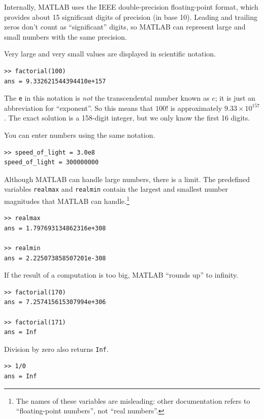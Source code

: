 \documentclass[
]{book}
\begin{document}
Internally, MATLAB uses the IEEE double-precision floating-point
format, which provides about 15 significant digits of precision (in
base 10).  Leading and trailing zeros don't count as ``significant''
digits, so MATLAB can represent large and small numbers
with the same precision.

Very large and very small values are displayed in scientific notation.

\begin{verbatim}
>> factorial(100)
ans = 9.332621544394410e+157
\end{verbatim}

The {\tt e} in this notation is {\em not} the transcendental number
known as $e$; it is just an abbreviation for ``exponent''.  So
this means that $100!$ is approximately $9.33 \times 10^{157}$.  The
exact solution is a 158-digit integer, but we only know the first 16
digits.

You can enter numbers using the same notation.

\begin{verbatim}
>> speed_of_light = 3.0e8
speed_of_light = 300000000
\end{verbatim}

Although MATLAB can handle large numbers, there is a limit.  The
predefined variables {\tt realmax} and {\tt realmin} contain the
largest and smallest number magnitudes that MATLAB can
handle.\footnote{The names of these variables are misleading: other
documentation refers to ``floating-point numbers'', not ``real
numbers''.}

\begin{verbatim}
>> realmax
ans = 1.797693134862316e+308

>> realmin
ans = 2.225073858507201e-308
\end{verbatim}

If the result of a computation is too big, MATLAB ``rounds up''
to infinity.

\begin{verbatim}
>> factorial(170)
ans = 7.257415615307994e+306

>> factorial(171)
ans = Inf
\end{verbatim}

Division by zero also returns {\tt Inf}.

\begin{verbatim}
>> 1/0
ans = Inf
\end{verbatim}
\end{document}
